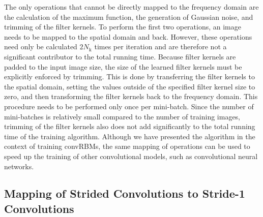 The only operations that cannot be directly mapped to the frequency domain are
the calculation of the maximum function, the generation of Gaussian noise, and
trimming of the filter kernels. To perform the first two operations, an image
needs to be mapped to the spatial domain and back. However, these operations
need only be calculated $2N_\text{k}$ times per iteration and are therefore not
a significant contributor to the total running time. Because filter kernels are
padded to the input image size, the size of the learned filter kernels must be
explicitly enforced by trimming. This is done by transferring the filter kernels
to the spatial domain, setting the values outside of the specified filter kernel
size to zero, and then transforming the filter kernels back to the frequency
domain. This procedure needs to be performed only once per mini-batch. Since the
number of mini-batches is relatively small compared to the number of training
images, trimming of the filter kernels also does not add significantly to the
total running time of the training algorithm. Although we have presented the
algorithm in the context of training convRBMs, the same mapping of operations
can be used to speed up the training of other convolutional models, such as
convolutional neural networks.

\subsection[Mapping of strided convolutions to stride-1 convolutions]{Mapping of
Strided Convolutions to Stride-1 Convolutions}
\label{sec:training:strided}


